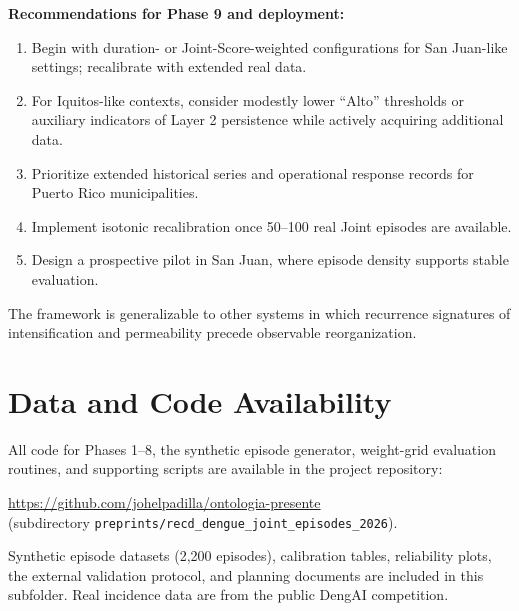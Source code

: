 \documentclass[11pt,a4paper]{article}
\begin{document}
\textbf{Recommendations for Phase 9 and deployment:}
\begin{enumerate}
    \item Begin with duration- or Joint-Score-weighted configurations for San Juan-like settings; recalibrate with extended real data.
    \item For Iquitos-like contexts, consider modestly lower “Alto” thresholds or auxiliary indicators of Layer 2 persistence while actively acquiring additional data.
    \item Prioritize extended historical series and operational response records for Puerto Rico municipalities.
    \item Implement isotonic recalibration once 50--100 real Joint episodes are available.
    \item Design a prospective pilot in San Juan, where episode density supports stable evaluation.
\end{enumerate}

The framework is generalizable to other systems in which recurrence signatures of intensification and permeability precede observable reorganization.

\section*{Data and Code Availability}

\begin{sloppypar}
All code for Phases 1--8, the synthetic episode generator, weight-grid evaluation routines, and supporting scripts are available in the project repository:

\url{https://github.com/johelpadilla/ontologia-presente}\\
(subdirectory \texttt{preprints/recd\_dengue\_joint\_episodes\_2026}).

Synthetic episode datasets (2,200 episodes), calibration tables, reliability plots, the external validation protocol, and planning documents are included in this subfolder. Real incidence data are from the public DengAI competition.
\end{sloppypar}
\end{document}

